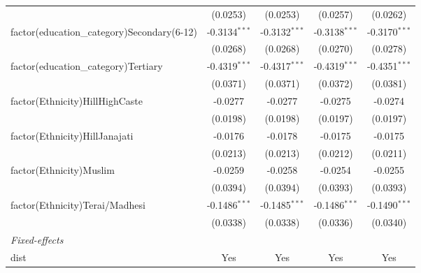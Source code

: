 \begin{tabular}{lcccc}
                                               & (0.0253)                & (0.0253)               & (0.0257)                & (0.0262)\\   
   factor(education\_category)Secondary(6-12)  & -0.3134$^{***}$         & -0.3132$^{***}$        & -0.3138$^{***}$         & -0.3170$^{***}$\\   
                                               & (0.0268)                & (0.0268)               & (0.0270)                & (0.0278)\\   
   factor(education\_category)Tertiary         & -0.4319$^{***}$         & -0.4317$^{***}$        & -0.4319$^{***}$         & -0.4351$^{***}$\\   
                                               & (0.0371)                & (0.0371)               & (0.0372)                & (0.0381)\\   
   factor(Ethnicity)HillHighCaste              & -0.0277                 & -0.0277                & -0.0275                 & -0.0274\\   
                                               & (0.0198)                & (0.0198)               & (0.0197)                & (0.0197)\\   
   factor(Ethnicity)HillJanajati               & -0.0176                 & -0.0178                & -0.0175                 & -0.0175\\   
                                               & (0.0213)                & (0.0213)               & (0.0212)                & (0.0211)\\   
   factor(Ethnicity)Muslim                     & -0.0259                 & -0.0258                & -0.0254                 & -0.0255\\   
                                               & (0.0394)                & (0.0394)               & (0.0393)                & (0.0393)\\   
   factor(Ethnicity)Terai/Madhesi              & -0.1486$^{***}$         & -0.1485$^{***}$        & -0.1486$^{***}$         & -0.1490$^{***}$\\   
                                               & (0.0338)                & (0.0338)               & (0.0336)                & (0.0340)\\   
   \midrule
   \emph{Fixed-effects}\\
   dist                                        & Yes                     & Yes                    & Yes                     & Yes\\  

\end{tabular}
